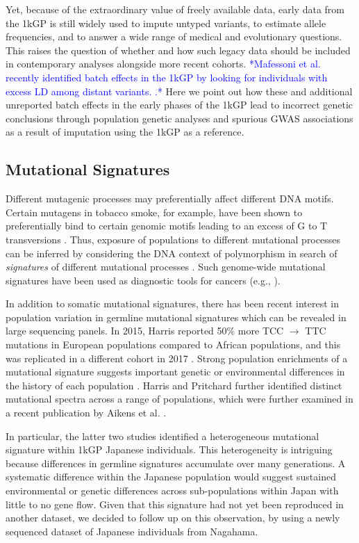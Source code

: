\documentclass[9pt,lineno]{template}
\newcommand{\todo}[1]{\textcolor{blue}{*#1*}}
\begin{document}
Yet, because of the extraordinary value of freely available data, early data from the 1kGP is still widely used to impute untyped variants, to estimate allele frequencies, and to answer a wide range of medical and evolutionary questions.
This raises the question of whether and how such legacy data should be included in contemporary analyses alongside more recent cohorts.
\todo{Mafessoni et al. recently identified batch effects in the 1kGP by looking for individuals with excess LD among distant variants. \citep{mafessoni2018turning}.}
Here we point out how these and additional unreported batch effects in the early phases of the 1kGP lead to incorrect genetic conclusions through population genetic analyses and spurious GWAS associations as a result of imputation using the 1kGP as a reference.

\subsection{Mutational Signatures}

Different mutagenic processes may preferentially affect different DNA motifs. 
Certain mutagens in tobacco smoke, for example, have been shown to preferentially bind to certain genomic motifs leading to an excess of G to T transversions \citep{Pfeifer2002,Pleasance2010}. 
Thus, exposure of populations to different mutational processes can be inferred by considering the DNA context of polymorphism in search of \textit{signatures} of different mutational processes \citep{Alexandrov2013,Shiraishi2015a}. 
Such genome-wide mutational signatures have been used as diagnostic tools for cancers (e.g., \cite{Alexandrov2013,Shiraishi2015a}).

In addition to somatic mutational signatures, there has been recent interest in population variation in germline mutational signatures which can be revealed in large sequencing panels. 
In 2015, Harris reported 50\% more TCC ${\rightarrow}$ TTC mutations in European populations compared to African populations, and this was replicated in a different cohort in 2017 \citep{Harris2015a, Harris2017a, Mathieson2017a}. 
Strong population enrichments of a mutational signature suggests important genetic or environmental differences in the history of each population \citep{Harris2015a, Harris2017a}. 
Harris and Pritchard further identified distinct mutational spectra across a range of populations, which were further examined in a recent publication by Aikens et al. \citep{Harris2017a,Aikens2018}.
 
In particular, the latter two studies  identified a heterogeneous mutational signature within 1kGP Japanese individuals.
This heterogeneity is intriguing because differences in germline signatures accumulate over many generations.
A systematic difference within the Japanese population would suggest sustained environmental or genetic differences across sub-populations within Japan with little to no gene flow.
Given that this signature had not yet been reproduced in another dataset, we decided to follow up on this observation, by using a newly sequenced dataset of Japanese individuals from Nagahama.
\end{document}
